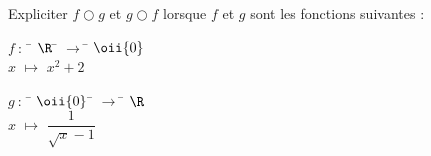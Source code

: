 \documentclass[a4paper,12pt,french]{book}
\begin{document}
\begin{exercice}[*]
Expliciter  $f\bigcirc g$ et $g\bigcirc f$ lorsque $f$ et $g$
sont les fonctions suivantes :
\begin{multicols}{2}
\begin{tabbing}
$f\ :\ $	\=	$\R$	\=	$\longrightarrow$	\=	$\oii{0}$\\
		\>	$x$		\> 	$\longmapsto$		\>	$x^2+2$
\end{tabbing}
\begin{tabbing}
$g\ :\ $	\=	$\oii{0}$	\=	$\longrightarrow$	\=	$\R$\\
			\>	$x$		\> 	$\longmapsto$		\>	$\dfrac{1}{\sqrt{x}-1}$
\end{tabbing}
\end{multicols}

\end{exercice}
\end{document}
